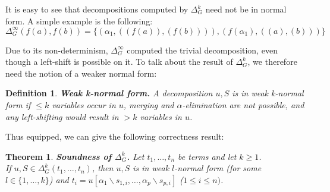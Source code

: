\documentclass[a4paper, 11pt]{report}
\newtheorem{theorem}{Theorem}
\newtheorem{definition}{Definition}
\begin{document}
It is easy to see that decompositions computed by $\Delta_G^k$ need not be in normal form. A simple example is the following:
$$
  \Delta_G^\infty(f(a),f(b)) = \{(\alpha_1,( (f(a)), (f(b)) )), (f(\alpha_1), ((a), (b)) )\}
$$

Due to its non-determinism, $\Delta_G^\infty$ computed the trivial decomposition, even though a left-shift is possible on it. To talk about the result of $\Delta_G^k$, we therefore need the notion of a weaker normal form:

\begin{definition}
\textbf{Weak k-normal form.}
A decomposition $u,S$ is in weak k-normal form if $\leq k$ variables occur in $u$, merging and $\alpha$-elimination are not possible, and any left-shifting would result in $> k$ variables in $u$.
\end{definition}

\noindent
Thus equipped, we can give the following correctness result:



\begin{theorem}
\textbf{Soundness of $\Delta_G^k$.}
Let $t_1,\dots,t_n$ be terms and let $k\geq 1$.\\
If $u,S \in \Delta_G^k(t_1,\dots,t_n)$, then $u,S$ is in weak $l$-normal form (for some $l \in \{1,\dots,k\}$) and $t_i = u[\alpha_1\backslash s_{1,i},\dots,\alpha_p\backslash s_{p,i}]$ ($1\leq i \leq n)$.
\label{thm:DeltaGkSoundness}
\end{theorem}
\end{document}
